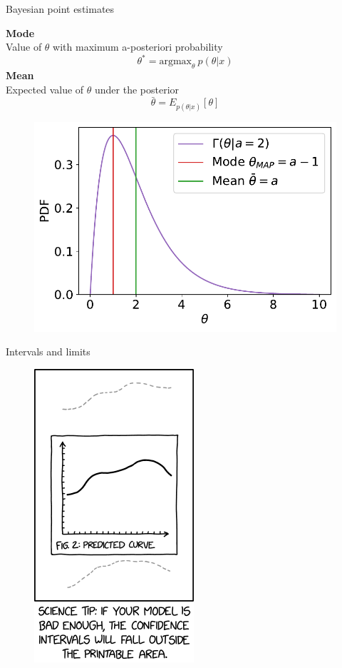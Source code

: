 \documentclass[
aspectratio=169,
14pt,
professionalfonts
]{beamer}
\begin{document}
\begin{frame}{Bayesian point estimates}
    \begin{minipage}{0.49\textwidth}
        \textbf{Mode}\\ Value of $\theta$ with maximum a-posteriori probability
            $$\theta^* = \text{argmax}_\theta ~ p(\theta|x)$$
        \textbf{Mean}\\ Expected value of $\theta$ under the posterior
            $$ \bar{\theta} = E_{p(\theta|x)}[\theta]$$
    \end{minipage}
    \begin{minipage}{0.49\textwidth}
        \begin{figure}
            \centering
            \includegraphics[width=\linewidth]{../plots/map_vs_mean.pdf}
        \end{figure}
    \end{minipage}
\end{frame}

\begin{frame}{Intervals and limits}
\begin{figure}
    \centering
    \includegraphics[width=0.25\linewidth]{../plots/confidence_interval.png}
\end{figure}
\end{frame}
\end{document}
